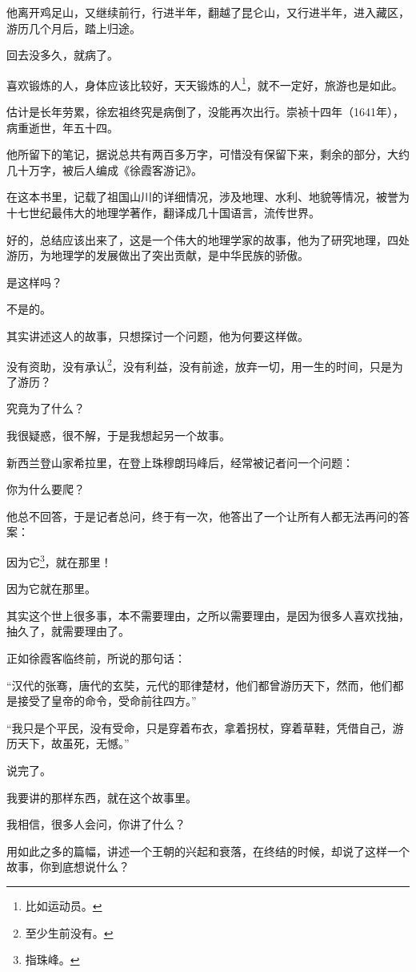 \begin{multicols}{\theparacolNo}
他离开鸡足山，又继续前行，行进半年，翻越了昆仑山，又行进半年，进入藏区，游历几个月后，踏上归途。

回去没多久，就病了。

喜欢锻炼的人，身体应该比较好，天天锻炼的人\footnote{比如运动员。}，就不一定好，旅游也是如此。

估计是长年劳累，徐宏祖终究是病倒了，没能再次出行。崇祯十四年（1641年），病重逝世，年五十四。

他所留下的笔记，据说总共有两百多万字，可惜没有保留下来，剩余的部分，大约几十万字，被后人编成《徐霞客游记》。

在这本书里，记载了祖国山川的详细情况，涉及地理、水利、地貌等情况，被誉为十七世纪最伟大的地理学著作，翻译成几十国语言，流传世界。

好的，总结应该出来了，这是一个伟大的地理学家的故事，他为了研究地理，四处游历，为地理学的发展做出了突出贡献，是中华民族的骄傲。

是这样吗？

不是的。

其实讲述这人的故事，只想探讨一个问题，他为何要这样做。

没有资助，没有承认\footnote{至少生前没有。}，没有利益，没有前途，放弃一切，用一生的时间，只是为了游历？

究竟为了什么？

我很疑惑，很不解，于是我想起另一个故事。

新西兰登山家希拉里，在登上珠穆朗玛峰后，经常被记者问一个问题：

你为什么要爬？

他总不回答，于是记者总问，终于有一次，他答出了一个让所有人都无法再问的答案：

因为它\footnote{指珠峰。}，就在那里！

因为它就在那里。

其实这个世上很多事，本不需要理由，之所以需要理由，是因为很多人喜欢找抽，抽久了，就需要理由了。

正如徐霞客临终前，所说的那句话：

“汉代的张骞，唐代的玄奘，元代的耶律楚材，他们都曾游历天下，然而，他们都是接受了皇帝的命令，受命前往四方。”

“我只是个平民，没有受命，只是穿着布衣，拿着拐杖，穿着草鞋，凭借自己，游历天下，故虽死，无憾。”

说完了。

我要讲的那样东西，就在这个故事里。

我相信，很多人会问，你讲了什么？

用如此之多的篇幅，讲述一个王朝的兴起和衰落，在终结的时候，却说了这样一个故事，你到底想说什么？


\end{multicols}
